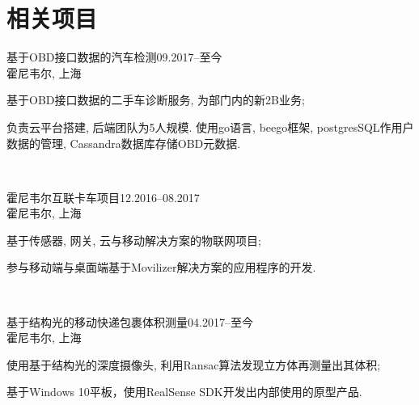 \documentclass[11pt]{article} %
\begin{document}
\begin{minipage}[t]{0.44\textwidth} %

\vspace{0pt} %
	
\section{相关项目}

\normalsize{基于OBD接口数据的汽车检测\hfill09.2017--至今}\\
\small 霍尼韦尔, 上海\\
\small
\begin{inparaitem} 
\item 基于OBD接口数据的二手车诊断服务, 为部门内的新2B业务;\\
\item 负责云平台搭建, 后端团队为5人规模. 使用go语言, beego框架, postgresSQL作用户数据的管理, Cassandra数据库存储OBD元数据.
\end{inparaitem}
\\\par 

\normalsize{霍尼韦尔互联卡车项目\hfill12.2016--08.2017}\\
\small 霍尼韦尔, 上海\\
\small
\begin{inparaitem} 
\item 基于传感器, 网关, 云与移动解决方案的物联网项目;\\
\item 参与移动端与桌面端基于Movilizer解决方案的应用程序的开发.
\end{inparaitem}
\\\par 

\normalsize{基于结构光的移动快递包裹体积测量\hfill04.2017--至今}\\
\small 霍尼韦尔, 上海\\
\small
\begin{inparaitem} 
\item 使用基于结构光的深度摄像头, 利用Ransac算法发现立方体再测量出其体积;\\
\item 基于Windows 10平板，使用RealSense SDK开发出内部使用的原型产品.
\end{inparaitem}
\\\par


\end{minipage}
\end{document}
